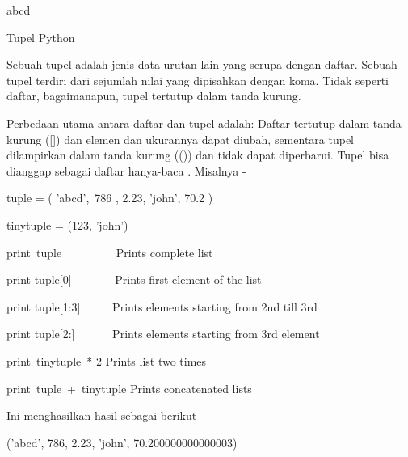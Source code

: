 \noindent 
abcd \par
\noindent 
[786, 2.23] \par
\noindent 
[2.23, 'john', 70.200000000000003] \par
{} \par
{} \par
\vspace{12pt}
\noindent 
Tupel Python \par
\vspace{12pt}
\noindent 
Sebuah tupel adalah jenis data urutan lain yang serupa dengan daftar. $  $Sebuah tupel terdiri dari sejumlah nilai yang dipisahkan dengan koma. $  $Tidak seperti daftar, bagaimanapun, tupel tertutup dalam tanda kurung. \par
\vspace{12pt}
\noindent 
Perbedaan utama antara daftar dan tupel adalah: Daftar tertutup dalam tanda kurung ([]) dan elemen dan ukurannya dapat diubah, sementara tupel dilampirkan dalam tanda kurung (()) dan tidak dapat diperbarui. $  $Tupel bisa dianggap sebagai $  $daftar $  $hanya-baca $  $. $  $Misalnya - \par
\vspace{12pt}
\vspace{12pt}
\noindent 
tuple = ( 'abcd',~786 , 2.23, 'john', 70.2  ) \par
\noindent 
tinytuple = (123, 'john') \par
\vspace{12pt}
\noindent 
print~tuple~~~~~~~~~   Prints complete list \par
\noindent 
print tuple[0]~~~~~~~  Prints first element of the list \par
\noindent 
print tuple[1:3]~~~~~  Prints elements starting from 2nd till 3rd  \par
\noindent 
print tuple[2:]~~~~~~  Prints elements starting from 3rd element \par
\noindent 
print~tinytuple~* 2    Prints list two times \par
\noindent 
print~tuple~+~tinytuple     Prints concatenated lists \par
\vspace{12pt}
\noindent 
Ini menghasilkan hasil sebagai berikut – \par
\vspace{12pt}
\noindent 
('abcd', 786, 2.23, 'john', 70.200000000000003) \par
\noindent 
